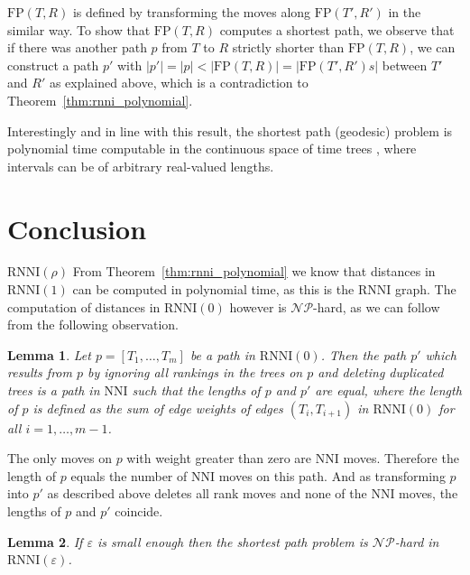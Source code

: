 \documentclass[11pt]{amsart}
\newtheorem{lemma}{Lemma}
\newcommand{\rnni}{\mathrm{RNNI}}
\newcommand{\nni}{\mathrm{NNI}}
\newcommand{\fp}{\mathrm{FP}}
\newcommand{\np}{\mathcal{NP}}
\newcommand{\p}{\mathcal{P}}
\newcommand{\summary}[1]{} %
\begin{document}
	$\fp(T,R)$ is defined by transforming the moves along $\fp(T',R')$ in the similar way.
	To show that $\fp(T, R)$ computes a shortest path, we observe that if there was another path $p$ from $T$ to $R$ strictly shorter than $\fp(T, R)$, we can construct a path $p'$ with $|p'| = |p| < |\fp(T,R)| = |\fp(T',R')s|$ between $T'$ and $R'$ as explained above, which is a contradiction to Theorem~\ref{thm:rnni_polynomial}.
\endproof

Interestingly and in line with this result, the shortest path (geodesic) problem is polynomial time computable in the continuous space of time trees \autocite{Gavryushkin2016-uu}, where intervals can be of arbitrary real-valued lengths.

\summary{Why the complexity of $\rnni(\rho)$ might be different from $\nni$ or $\rnni$ for $\rho$ big enough.}


\section{Conclusion}

\summary{Everything we know so far about the complexity of} $\rnni(\rho)$ \summary{-- $\rnni(1) \in \p$ and $\rnni(0) \in \np$}
From Theorem~\ref{thm:rnni_polynomial} we know that distances in $\rnni(1)$ can be computed in polynomial time, as this is the $\rnni$ graph.
The computation of distances in $\rnni(0)$ however is $\np$-hard, as we can follow from the following observation.

\begin{lemma}
Let $p = [T_1, \ldots, T_m]$ be a path in $\rnni(0)$.
Then the path $p'$ which results from $p$ by ignoring all rankings in the trees on $p$ and deleting duplicated trees is a path in $\nni$ such that the lengths of $p$ and $p'$ are equal, where the length of $p$ is defined as the sum of edge weights of edges $(T_i,T_{i+1})$ in $\rnni(0)$ for all $i = 1, \ldots, m-1$.
\end{lemma}

\proof
The only moves on $p$ with weight greater than zero are $\nni$ moves.
Therefore the length of $p$ equals the number of $\nni$ moves on this path.
And as transforming $p$ into $p'$ as described above deletes all rank moves and none of the $\nni$ moves, the lengths of $p$ and $p'$ coincide.
\endproof

\begin{lemma}
If $\varepsilon$ is small enough then the shortest path problem is $\np$-hard in $\rnni(\varepsilon)$.
\end{lemma}
\end{document}
